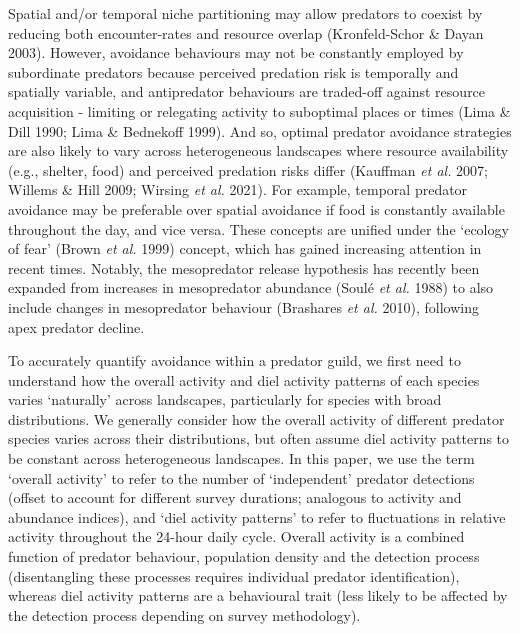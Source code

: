 \documentclass[11pt,a4paper,titlepage,twoside,openright]{style/unimelbthesis}
\begin{document}
\begin{mainmatter}
Spatial and/or temporal niche partitioning may allow predators to coexist by reducing both encounter-rates and resource overlap (Kronfeld-Schor \& Dayan 2003). However, avoidance behaviours may not be constantly employed by subordinate predators because perceived predation risk is temporally and spatially variable, and antipredator behaviours are traded-off against resource acquisition - limiting or relegating activity to suboptimal places or times (Lima \& Dill 1990; Lima \& Bednekoff 1999). And so, optimal predator avoidance strategies are also likely to vary across heterogeneous landscapes where resource availability (e.g., shelter, food) and perceived predation risks differ (Kauffman \emph{et al.} 2007; Willems \& Hill 2009; Wirsing \emph{et al.} 2021). For example, temporal predator avoidance may be preferable over spatial avoidance if food is constantly available throughout the day, and vice versa. These concepts are unified under the `ecology of fear' (Brown \emph{et al.} 1999) concept, which has gained increasing attention in recent times. Notably, the mesopredator release hypothesis has recently been expanded from increases in mesopredator abundance (Soulé \emph{et al.} 1988) to also include changes in mesopredator behaviour (Brashares \emph{et al.} 2010), following apex predator decline.

To accurately quantify avoidance within a predator guild, we first need to understand how the overall activity and diel activity patterns of each species varies `naturally' across landscapes, particularly for species with broad distributions. We generally consider how the overall activity of different predator species varies across their distributions, but often assume diel activity patterns to be constant across heterogeneous landscapes. In this paper, we use the term `overall activity' to refer to the number of `independent' predator detections (offset to account for different survey durations; analogous to activity and abundance indices), and `diel activity patterns' to refer to fluctuations in relative activity throughout the 24-hour daily cycle. Overall activity is a combined function of predator behaviour, population density and the detection process (disentangling these processes requires individual predator identification), whereas diel activity patterns are a behavioural trait (less likely to be affected by the detection process depending on survey methodology).


\end{mainmatter}
\end{document}
